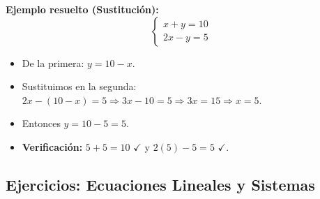 \documentclass[12pt, letterpaper]{article}
\begin{document}
\noindent\textbf{Ejemplo resuelto (Sustitución):}
$$\begin{cases} x + y = 10 \\ 2x - y = 5 \end{cases}$$

\begin{itemize}
  \item De la primera: $y = 10 - x$.
  \item Sustituimos en la segunda: $2x - (10 - x) = 5 \Rightarrow 3x - 10 = 5 \Rightarrow 3x = 15 \Rightarrow x = 5$.
  \item Entonces $y = 10 - 5 = 5$.
  \item \textbf{Verificación:} $5 + 5 = 10$ $\checkmark$ y $2(5) - 5 = 5$ $\checkmark$.
\end{itemize}

\newpage

\subsection{Ejercicios: Ecuaciones Lineales y Sistemas}
\end{document}

